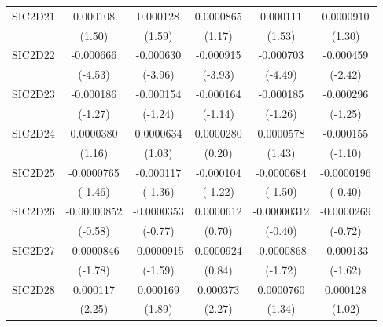\begin{table}[htbp]
\begin{tabular}{l*{5}{c}}
SIC2D21     &    0.000108         &    0.000128         &   0.0000865         &    0.000111         &   0.0000910         \\
            &      (1.50)         &      (1.59)         &      (1.17)         &      (1.53)         &      (1.30)         \\
SIC2D22     &   -0.000666\sym{***}&   -0.000630\sym{***}&   -0.000915\sym{***}&   -0.000703\sym{***}&   -0.000459\sym{*}  \\
            &     (-4.53)         &     (-3.96)         &     (-3.93)         &     (-4.49)         &     (-2.42)         \\
SIC2D23     &   -0.000186         &   -0.000154         &   -0.000164         &   -0.000185         &   -0.000296         \\
            &     (-1.27)         &     (-1.24)         &     (-1.14)         &     (-1.26)         &     (-1.25)         \\
SIC2D24     &   0.0000380         &   0.0000634         &   0.0000280         &   0.0000578         &   -0.000155         \\
            &      (1.16)         &      (1.03)         &      (0.20)         &      (1.43)         &     (-1.10)         \\
SIC2D25     &  -0.0000765         &   -0.000117         &   -0.000104         &  -0.0000684         &  -0.0000196         \\
            &     (-1.46)         &     (-1.36)         &     (-1.22)         &     (-1.50)         &     (-0.40)         \\
SIC2D26     & -0.00000852         &  -0.0000353         &   0.0000612         & -0.00000312         &  -0.0000269         \\
            &     (-0.58)         &     (-0.77)         &      (0.70)         &     (-0.40)         &     (-0.72)         \\
SIC2D27     &  -0.0000846         &  -0.0000915         &   0.0000924         &  -0.0000868         &   -0.000133         \\
            &     (-1.78)         &     (-1.59)         &      (0.84)         &     (-1.72)         &     (-1.62)         \\
SIC2D28     &    0.000117\sym{*}  &    0.000169         &    0.000373\sym{*}  &   0.0000760         &    0.000128         \\
            &      (2.25)         &      (1.89)         &      (2.27)         &      (1.34)         &      (1.02)         \\

\end{tabular}
\end{table}
